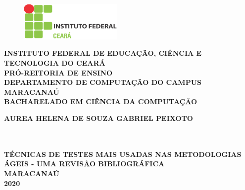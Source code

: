 \thispagestyle{empty}

\vfill
 \begin{center}
    \begin{figure}[t]
     \centering
            \includegraphics[width=5cm]{./figures/IF_logo.png}\\[-0.1in]
     \end{figure}

    {\large\bfseries INSTITUTO FEDERAL DE EDUCAÇÃO, CIÊNCIA E TECNOLOGIA DO CEARÁ} \\
    {\large\bfseries PRÓ-REITORIA DE ENSINO} \\
    {\large\bfseries DEPARTAMENTO DE COMPUTAÇÃO DO CAMPUS MARACANAÚ}  \\ 
    {\large\bfseries BACHARELADO EM CIÊNCIA DA COMPUTAÇÃO}  \\ 

    \vspace*{1in}
    \begin{large} \bfseries AUREA HELENA DE SOUZA GABRIEL PEIXOTO\end{large}\\[0.4in]

    \vspace*{4cm}
    \noindent \\
    \large\bfseries{T{\'E}CNICAS DE TESTES MAIS USADAS NAS METODOLOGIAS {\'A}GEIS - UMA REVIS{\~A}O BIBLIOGR{\'A}FICA } \\
    \vfill
    \large\bfseries{ MARACANAÚ \\ 2020}
\end{center}

\normalsize
